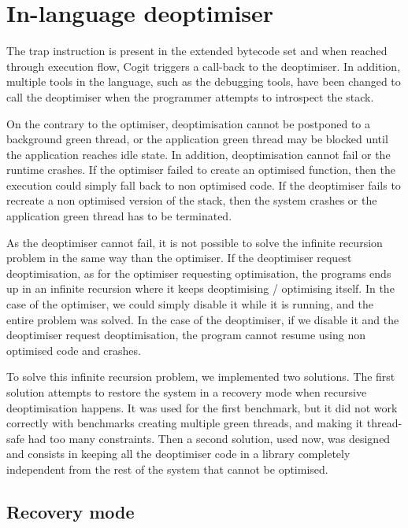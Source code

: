 \documentclass[a4paper,12pt,twoside]{../includes/ThesisStyle}
\begin{document}
\section{In-language deoptimiser}

The trap instruction is present in the extended bytecode set and when reached through execution flow, Cogit triggers a call-back to the deoptimiser. In addition, multiple tools in the language, such as the debugging tools, have been changed to call the deoptimiser when the programmer attempts to introspect the stack.

On the contrary to the optimiser, deoptimisation cannot be postponed to a background green thread, or the application green thread may be blocked until the application reaches idle state. In addition, deoptimisation cannot fail or the runtime crashes. If the optimiser failed to create an optimised function, then the execution could simply fall back to non optimised code. If the deoptimiser fails to recreate a non optimised version of the stack, then the system crashes or the application green thread has to be terminated.


As the deoptimiser cannot fail, it is not possible to solve the infinite recursion problem in the same way than the optimiser. If the deoptimiser request deoptimisation, as for the optimiser requesting optimisation, the programs ends up in an infinite recursion where it keeps deoptimising / optimising itself. In the case of the optimiser, we could simply disable it while it is running, and the entire problem was solved. In the case of the deoptimiser, if we disable it and the deoptimiser request deoptimisation, the program cannot resume using non optimised code and crashes. 

To solve this infinite recursion problem, we implemented two solutions. The first solution attempts to restore the system in a recovery mode when recursive deoptimisation happens. It was used for the first benchmark, but it did not work correctly with benchmarks creating multiple green threads, and making it thread-safe had too many constraints. Then a second solution, used now, was designed and consists in keeping all the deoptimiser code in a library completely independent from the rest of the system that cannot be optimised.

\subsection{Recovery mode}
\end{document}
